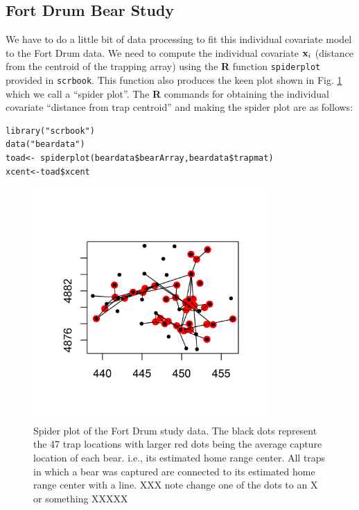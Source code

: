 \subsection{Fort Drum Bear Study}


We have to do a little bit of data processing to fit this individual
covariate model to the Fort Drum data.  We need to compute the
individual covariate ${\bf x}_{i}$ (distance from the centroid of the
trapping array) using the {\bf R} function \mbox{\tt spiderplot}
provided in \mbox{\tt scrbook}. This function also produces the keen
plot shown in Fig. \ref{closed.fig.spiderplot} which we call a
``spider plot''.  The {\bf R} commands for obtaining the individual
covariate ``distance from trap centroid'' and making the spider plot
are as follows:
\begin{verbatim}
library("scrbook")
data("beardata")
toad<- spiderplot(beardata$bearArray,beardata$trapmat)
xcent<-toad$xcent
\end{verbatim}
\begin{figure}
\centering
\includegraphics[height=3.5in,width=3.5in]{Ch3/figs/bear_spiderplot.png}
\caption{Spider plot of the Fort Drum study data.
The black dots represent the 47 trap locations with larger red dots
being the average capture location of each bear. i.e., its estimated home
range center. All traps in which a bear was captured are connected to
its estimated home range center with a line.
XXX note change one of the dots to an X or something XXXXX
}
\label{closed.fig.spiderplot}
\end{figure}

